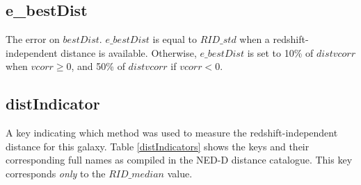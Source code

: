 \subsection{e\_bestDist} \label{e_bestDist}
The error on $bestDist$. $e\_bestDist$ is equal to $RID\_std$ when a redshift-independent distance is available. Otherwise, $e\_bestDist$ is set to 10\% of $distvcorr$ when $vcorr \geq 0$, and 50\% of $distvcorr$ if $vcorr < 0$.


\subsection{distIndicator} \label{distIndicator}
A key indicating which method was used to measure the redshift-independent distance for this galaxy. Table \ref{distIndicators} shows the keys and their corresponding full names as compiled in the NED-D distance catalogue. This key corresponds \textit{only} to the $RID\_median$ value.



